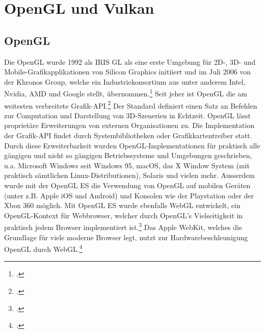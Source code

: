 \documentclass[titlepage, 11pt, a4paper, ngerman]{article}
\begin{document}
\newpage
\section{OpenGL und Vulkan}

\subsection{OpenGL}
Die \acrfull{OpenGL} wurde 1992 als IRIS GL als eine erste Umgebung für 2D-, 3D- und Mobile-Grafikapplikationen von Silicon Graphics initiiert und im Juli 2006 von der Khronos Group, welche ein Industriekonsortium aus unter anderem Intel, Nvidia, AMD und Google stellt, übernommen.\footcite{wasistopengl} Seit jeher ist \acrshort{OpenGL} die am weitesten verbreitete Grafik-\acrshort{API}.\footcite{aboutopengl} Der Standard definiert einen Satz an Befehlen zur Computation und Darstellung von 3D-Szenerien in Echtzeit. \acrshort{OpenGL} lässt proprietäre Erweiterungen von externen Organisationen zu. Die Implementation der Grafik-\acrshort{API} findet durch Systembibliotheken oder Grafikkartentreiber statt. Durch diese Erweiterbarkeit wurden \acrshort{OpenGL}-Implementationen für praktisch alle gängigen und nicht so gängigen Betriebssysteme und Umgebungen geschrieben, u.a. Microsoft Windows seit Windows 95, macOS, das X Window System (mit praktisch sämtlichen \gls{Linux}-Distributionen), Solaris und vielen mehr. Ausserdem wurde mit der \acrfull{OpenGL ES} die Verwendung von \acrshort{OpenGL} auf mobilen Geräten (unter z.B. Apple iOS und Android) und Konsolen wie der Playstation oder der Xbox 360 möglich. Mit \acrshort{OpenGL ES} wurde ebenfalls WebGL entwickelt, ein \acrshort{OpenGL}-Kontext für Webbrowser, welcher durch \acrshort{OpenGL}'s Vielseitigkeit in praktisch jedem Browser implementiert ist.\footcite{oglwiki-related} Das Apple WebKit, welches die Grundlage für viele moderne Browser legt, nutzt zur Hardwarebeschleunigung \acrshort{OpenGL} durch WebGL.\footcite{webkithwa}
\end{document}
